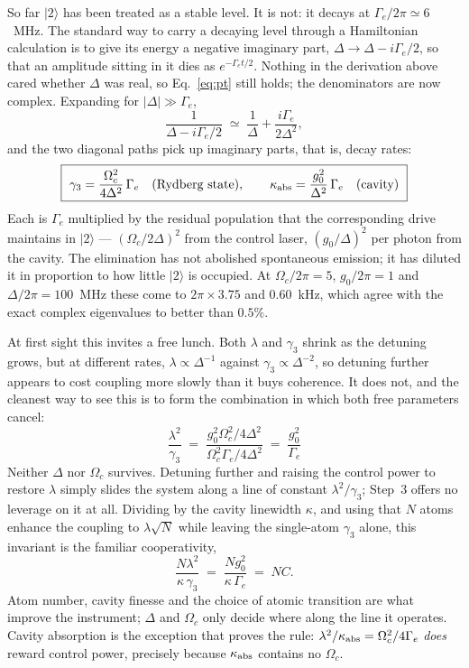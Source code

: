 \documentclass[11pt,a4paper]{article}
\newcommand{\ket}[1]{\lvert #1 \rangle}
\newcommand{\Om}{\Omega}
\begin{document}
So far $\ket{2}$ has been treated as a stable level. It is not: it decays at
$\Gamma_e/2\pi\simeq6$~MHz. The standard way to carry a decaying level through a Hamiltonian
calculation is to give its energy a negative imaginary part, $\Delta\to\Delta-i\Gamma_e/2$, so
that an amplitude sitting in it dies as $e^{-\Gamma_e t/2}$. Nothing in the derivation above
cared whether $\Delta$ was real, so Eq.~\eqref{eq:pt} still holds; the denominators are now
complex. Expanding for $|\Delta|\gg\Gamma_e$,
\begin{equation}
  \frac{1}{\Delta-i\Gamma_e/2}\;\simeq\;\frac{1}{\Delta}+\frac{i\Gamma_e}{2\Delta^2},
\end{equation}
and the two diagonal paths pick up imaginary parts, that is, decay rates:
\begin{equation}
  \boxed{\ \gamma_3 = \frac{\Om_c^2}{4\Delta^2}\,\Gamma_e \quad(\text{Rydberg state}),
  \qquad
  \kappa_{\rm abs} = \frac{g_0^2}{\Delta^2}\,\Gamma_e \quad(\text{cavity})\ }
  \label{eq:losses}
\end{equation}
Each is $\Gamma_e$ multiplied by the residual population that the corresponding drive maintains
in $\ket{2}$ --- $(\Om_c/2\Delta)^2$ from the control laser, $(g_0/\Delta)^2$ per photon from
the cavity. The elimination has not abolished spontaneous emission; it has diluted it in
proportion to how little $\ket{2}$ is occupied. At $\Om_c/2\pi=5$, $g_0/2\pi=1$ and
$\Delta/2\pi=100$~MHz these come to $2\pi\times3.75$ and $0.60$~kHz, which agree with the exact
complex eigenvalues to better than $0.5\%$.

At first sight this invites a free lunch. Both $\lambda$ and $\gamma_3$ shrink as the detuning
grows, but at different rates, $\lambda\propto\Delta^{-1}$ against
$\gamma_3\propto\Delta^{-2}$, so detuning further appears to cost coupling more slowly than it
buys coherence. It does not, and the cleanest way to see this is to form the combination in
which both free parameters cancel:
\begin{equation}
  \boxed{\ \frac{\lambda^{2}}{\gamma_3}
  \;=\; \frac{g_0^2\Om_c^2/4\Delta^2}{\Om_c^2\Gamma_e/4\Delta^2}
  \;=\; \frac{g_0^2}{\Gamma_e}\ }
  \label{eq:invariant}
\end{equation}
Neither $\Delta$ nor $\Om_c$ survives. Detuning further and raising the control power to
restore $\lambda$ simply slides the system along a line of constant $\lambda^2/\gamma_3$;
Step~3 offers no leverage on it at all. Dividing by the cavity linewidth $\kappa$, and using
that $N$ atoms enhance the coupling to $\lambda\sqrt N$ while leaving the single-atom $\gamma_3$
alone, this invariant is the familiar cooperativity,
\begin{equation}
  \frac{N\lambda^{2}}{\kappa\,\gamma_3} \;=\; \frac{Ng_0^{2}}{\kappa\,\Gamma_e} \;=\; NC .
\end{equation}
Atom number, cavity finesse and the choice of atomic transition are what improve the instrument;
$\Delta$ and $\Om_c$ only decide where along the line it operates. Cavity absorption is the
exception that proves the rule: $\lambda^2/\kappa_{\rm abs}=\Om_c^2/4\Gamma_e$ \emph{does}
reward control power, precisely because $\kappa_{\rm abs}$ contains no $\Om_c$.
\end{document}
